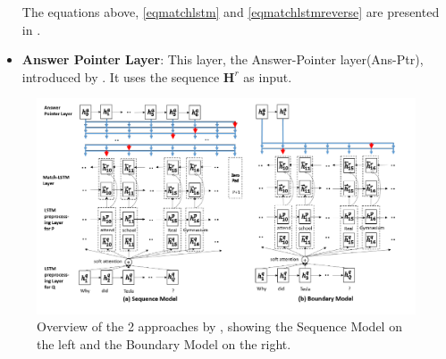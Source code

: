 \documentclass[a4paper,12pt]{report}
\begin{document}
\begin{itemize}
		The equations above, \ref{eqmatchlstm} and \ref{eqmatchlstmreverse} are presented in \citep{lstmhu2016question}.
             	\item \textbf{Answer Pointer Layer}: This layer, the Answer-Pointer layer(Ans-Ptr), introduced by \citep{lstmPointer}. It uses the sequence $ \textbf{H}^{r} $ as input.
             \end{itemize}
         	  \begin{figure}
	         	\centering
	         	\includegraphics[scale=0.4]{../images/lstmMatch.png}
	         	\caption{Overview of the 2 approaches by \citep{lstmhu2016question}, showing the Sequence Model on the left and the Boundary Model on the right.}\label{lstmMatch}
	         \end{figure}
\end{document}
